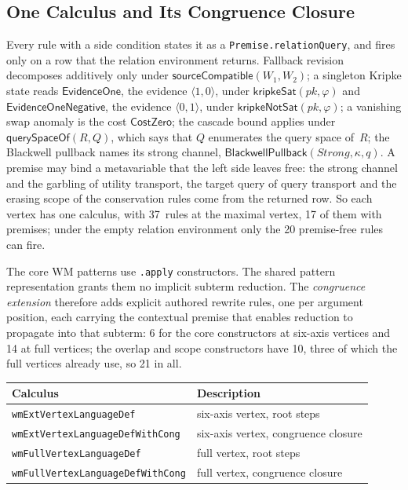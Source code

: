 \documentclass[11pt,openany]{report}
\begin{document}
\subsection{One Calculus and Its Congruence Closure}
\label{sec:wm-one-calculus}
\label{sec:wm-context-closure}

Every rule with a side condition states it as a
\texttt{Premise.relationQuery}, and fires only on a row that the relation
environment returns.  Fallback revision decomposes additively only under
$\mathsf{sourceCompatible}(W_1, W_2)$; a singleton Kripke state reads
$\mathsf{EvidenceOne}$, the evidence $\langle 1, 0\rangle$, under
$\mathsf{kripkeSat}(pk, \varphi)$ and $\mathsf{EvidenceOneNegative}$, the
evidence $\langle 0, 1\rangle$, under $\mathsf{kripkeNotSat}(pk, \varphi)$;
a vanishing swap anomaly is the cost $\mathsf{CostZero}$; the cascade bound
applies under $\mathsf{querySpaceOf}(R, Q)$, which says that $Q$ enumerates
the query space of~$R$; the Blackwell pullback names its strong channel,
$\mathsf{BlackwellPullback}(\mathit{Strong}, \kappa, q)$.  A premise may bind
a metavariable that the left side leaves free: the strong channel and the
garbling of utility transport, the target query of query transport and the
erasing scope of the conservation rules come from the returned row.  So each
vertex has one calculus, with 37~rules at the maximal vertex, 17 of them with
premises; under the empty relation environment only the 20 premise-free
rules can fire.

The core WM patterns use \texttt{.apply} constructors.  The shared pattern
representation grants them no implicit subterm reduction.  The
\emph{congruence extension} therefore adds explicit authored rewrite rules,
one per argument position, each carrying the contextual premise that enables
reduction to propagate into that subterm: 6 for the core constructors at
six-axis vertices and 14 at full vertices; the overlap and scope
constructors have 10, three of which the full vertices already use, so 21 in
all.

\begin{center}
\begin{tabular}{ll}
\toprule
\textbf{Calculus} & \textbf{Description} \\
\midrule
\texttt{wmExtVertexLanguageDef} & six-axis vertex, root steps \\
\texttt{wmExtVertexLanguageDefWithCong} & six-axis vertex, congruence closure \\
\texttt{wmFullVertexLanguageDef} & full vertex, root steps \\
\texttt{wmFullVertexLanguageDefWithCong} & full vertex, congruence closure \\
\bottomrule
\end{tabular}
\end{center}
\end{document}
